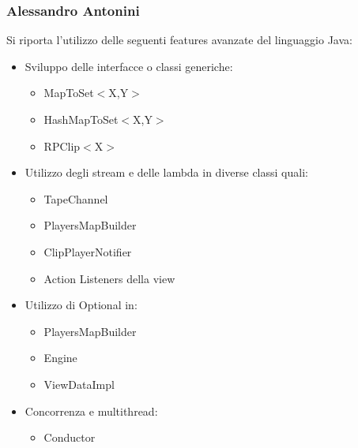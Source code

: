 \documentclass[a4paper,12pt]{report}
\begin{document}
\subsubsection{Alessandro Antonini}
Si riporta l’utilizzo delle seguenti features avanzate del linguaggio Java:
\begin{itemize}
    \item Sviluppo delle interfacce o classi generiche:
    \begin{itemize}
        \item MapToSet\begin{math}<\end{math}X,Y\begin{math}>\end{math}
        \item HashMapToSet\begin{math}<\end{math}X,Y\begin{math}>\end{math}
        \item RPClip\begin{math}<\end{math}X\begin{math}>\end{math}
    \end{itemize}
    \item Utilizzo degli stream e delle lambda in diverse classi quali:
    \begin{itemize}
        \item TapeChannel
        \item PlayersMapBuilder
        \item ClipPlayerNotifier
        \item Action Listeners della view
    \end{itemize}
    \item Utilizzo di Optional in: 
    \begin{itemize}
        \item PlayersMapBuilder
        \item Engine
        \item ViewDataImpl
    \end{itemize}
    \item Concorrenza e multithread:
    \begin{itemize}
        \item Conductor
    \end{itemize}
\end{itemize}
\endsubsubsection
\end{document}
